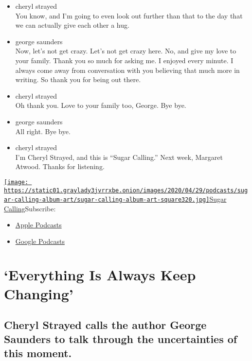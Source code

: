 \begin{itemize}
\item
  cheryl strayed\\
  You know, and I'm going to even look out further than that to the day
  that we can actually give each other a hug.
\item
  george saunders\\
  Now, let's not get crazy. Let's not get crazy here. No, and give my
  love to your family. Thank you so much for asking me. I enjoyed every
  minute. I always come away from conversation with you believing that
  much more in writing. So thank you for being out there.
\item
  cheryl strayed\\
  Oh thank you. Love to your family too, George. Bye bye.
\item
  george saunders\\
  All right. Bye bye.
\item
  cheryl strayed\\
  I'm Cheryl Strayed, and this is ``Sugar Calling.'' Next week, Margaret
  Atwood. Thanks for listening.
\end{itemize}

\href{https://www.nytimes3xbfgragh.onion/column/sugar-calling}{\texttt{[image: https://static01.graylady3jvrrxbe.onion/images/2020/04/29/podcasts/sugar-calling-album-art/sugar-calling-album-art-square320.jpg]}Sugar
Calling}Subscribe:

\begin{itemize}
\tightlist
\item
  \href{https://itunes.apple.com/us/podcast/id1505881384}{Apple
  Podcasts}
\item
  \href{https://podcasts.google.com/?feed=aHR0cHM6Ly9yc3MuYXJ0MTkuY29tL3N1Z2FyLWNhbGxpbmc\&ved=0CAUQrrcFahcKEwjA8Kyn09voAhUAAAAAHQAAAAAQBQ}{Google
  Podcasts}
\end{itemize}

\hypertarget{everything-is-always-keep-changing-1}{%
\section{`Everything Is Always Keep
Changing'}\label{everything-is-always-keep-changing-1}}

\hypertarget{cheryl-strayed-calls-the-author-george-saunders-to-talk-through-the-uncertainties-of-this-moment-1}{%
\subsection{Cheryl Strayed calls the author George Saunders to talk
through the uncertainties of this
moment.}\label{cheryl-strayed-calls-the-author-george-saunders-to-talk-through-the-uncertainties-of-this-moment-1}}

